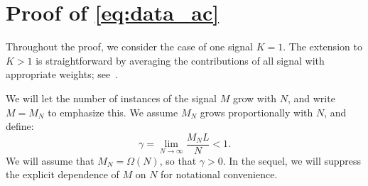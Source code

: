 \documentclass[english,11pt]{article}
\newcommand{\1}{\mathbf{1}}
\newcommand{\TODO}[1]{{\color{red}{[#1]}}}
\numberwithin{equation}{section}
\theoremstyle{plain}
\theoremstyle{definition}
\theoremstyle{remark}
\theoremstyle{plain}
\theoremstyle{remark}
\theoremstyle{plain}
\theoremstyle{plain}
\begin{document}
%
%








\appendix

\section{Proof of \eqref{eq:data_ac}} \label{sec:autocorrelation_computation}

Throughout the proof, we consider the case of one signal $K=1$. The extension to $K>1$ is straightforward by averaging the contributions of all signal with  appropriate weights; see~\cite{boumal2017heterogeneous}. 

We will let the number of instances of the signal $M$ grow with $N$, and write $M=M_N$ to emphasize this. We assume $M_N$ grows proportionally with $N$, and define:
%
\begin{equation}
\gamma = \lim_{N\to\infty} \frac{M_NL}{N}<1.
\end{equation}
%
We will assume that $M_N=\Omega(N)$, so that $\gamma>0$. In the sequel, we will suppress the explicit dependence of $M$ on $N$ for notational convenience.
\end{document}

